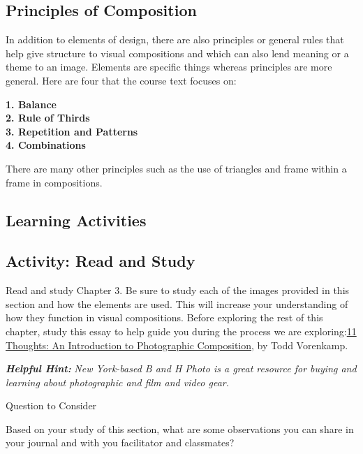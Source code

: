 \documentclass[
]{book}
\begin{document}
\hypertarget{principles-of-composition}{%
\subsection*{Principles of Composition}\label{principles-of-composition}}

In addition to elements of design, there are also principles or general rules that help give structure to visual compositions and which can also lend meaning or a theme to an image. Elements are specific things whereas principles are more general. Here are four that the course text focuses on:

\textbf{1. Balance}\\
\textbf{2. Rule of Thirds}\\
\textbf{3. Repetition and Patterns}\\
\textbf{4. Combinations}

There are many other principles such as the use of triangles and frame within a frame in compositions.

\hypertarget{learning-activities-4}{%
\subsection*{Learning Activities}\label{learning-activities-4}}

\hypertarget{activity-read-and-study}{%
\subsection*{Activity: Read and Study}\label{activity-read-and-study}}

\begin{reflect}
Read and study Chapter 3. Be sure to study each of the images provided in this section and how the elements are used. This will increase your understanding of how they function in visual compositions.
Before exploring the rest of this chapter, study this essay to help guide you during the process we are exploring:\href{https://www.bhphotovideo.com/explora/photography/tips-and-solutions/11-thoughts-introduction-photographic-composition}{11 Thoughts: An Introduction to Photographic Composition}, by Todd Vorenkamp.

\textbf{\emph{Helpful Hint:}} \emph{New York-based B and H Photo is a great resource for buying and learning about photographic and film and video gear.}

{Question to Consider}

Based on your study of this section, what are some observations you can share in your journal and with you facilitator and classmates?
\end{reflect}
\end{document}
